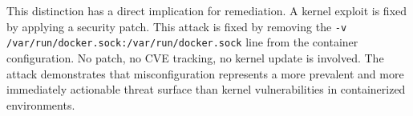 This distinction has a direct implication for remediation. A kernel exploit is fixed by applying a security patch. This attack is fixed by removing the \texttt{-v /var/run/docker.sock:/var/run/docker.sock} line from the container configuration. No patch, no CVE tracking, no kernel update is involved. The attack demonstrates that misconfiguration represents a more prevalent and more immediately actionable threat surface than kernel vulnerabilities in containerized environments.

\vspace{0.5cm}